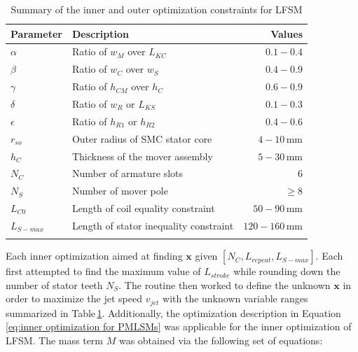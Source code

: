                 
                \begin{table}[!ht]
                    \renewcommand{\arraystretch}{1.2}
                    \caption{Summary of the inner and outer optimization constraints for \acs{LFSM}}
                    \label{table:chap/rsm/LFSM/optimization unknown constraints}
                    \centering
                    \begin{tabular}{@{}llr@{}}
                    \hline
                    \bfseries Parameter & \bfseries Description & \bfseries Values\\
                    \hline
                        $\alpha$	    & Ratio of $w_M$ over $L_{KC}$              &	$0.1-0.4$\\ 
                        $\beta$	        & Ratio of $w_C$ over $w_S$		            &	$0.4-0.9$\\ 
                        $\gamma$	    & Ratio of $h_{CM}$ over $h_C$			    &	$0.6-0.9$\\ 
                        $\delta$	    & Ratio of $w_R$ or $L_{KS}$		        &	$0.1-0.3$\\ 
                        $\epsilon$	    & Ratio of $h_{R1}$ or $h_{R2}$		        &	$0.4-0.6$\\ 
                        $r_{so}$	    & Outer radius of SMC stator core 			&	$4-10\,\mathrm{mm}$\\ 
                        $h_C$           & Thickness of the mover assembly           &	$5-30\,\mathrm{mm}$\\ 
                    \hline
                        $N_C$	        & Number of armature slots 		            &	$6$\\ 
                        $N_S$	        & Number of mover pole 		                &	$\geq 8$\\ 
                        $L_{C0}$	    & Length of coil equality constraint		&	$50-90\,\mathrm{mm}$\\ 
                        $L_{S-max}$	    & Length of stator inequality constraint	&	$120-160\,\mathrm{mm}$\\
                    \hline  \\
                    \end{tabular}
                \end{table}    
                
                
                Each inner optimization aimed at finding $\textbf{x}$ given $[N_C, L_{repeat}, L_{S-max}]$. Each first attempted to find the maximum value of $L_{stroke}$ while rounding down the number of stator teeth $N_S$. The routine then worked to define the unknown $\textbf{x}$ in order to maximize the jet speed $v_{jet}$ with the unknown variable ranges summarized in Table\,\ref{table:chap/rsm/LFSM/optimization unknown constraints}. Additionally, the optimization description in Equation\,\ref{eq:inner optimization for PMLSMs} was applicable for the inner optimization of \acs{LFSM}. The mass term $M$ was obtained via the following set of equations:
                
